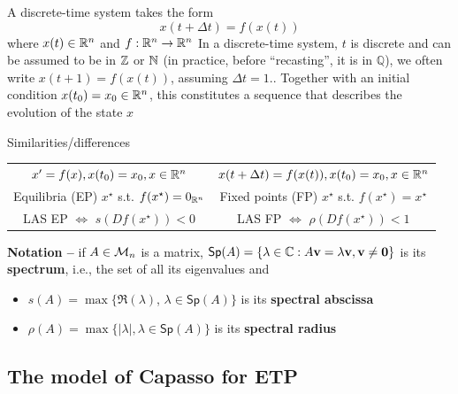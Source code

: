 \documentclass[aspectratio=169]{beamer}
\begin{document}
\begin{frame}
  A discrete-time system takes the form
  \begin{equation}\label{eq:DTS}
    x(t+\Delta t) = f(x(t))
  \end{equation}
  where $x(t)\in\mathbb{R}^n$ and $f:\mathbb{R}^n\to\mathbb{R}^n$
  \vfill
  In a discrete-time system, $t$ is discrete and can be assumed to be in $\mathbb{Z}$ or $\mathbb{N}$ (in practice, before ``recasting'', it is in $\mathbb{Q}$), we often write $x(t+1)=f(x(t))$, assuming $\Delta t=1$..
  \vfill
  Together with an initial condition $x(t_0)=x_0\in\mathbb{R}^n$, this constitutes a sequence that describes the evolution of the state $x$
\end{frame}

\begin{frame}{Similarities/differences}
  \begin{center}
    \renewcommand{\arraystretch}{1.5}
    \begin{tabular}{cc}
      $x'=f(x), x(t_0)=x_0, x\in\mathbb{R}^n$
      &
      $x(t+\Delta t)=f(x(t)), x(t_0)=x_0, x\in\mathbb{R}^n$ \\
      Equilibria (EP) $x^\star$ s.t. $f(x^\star)=0_{\mathbb{R}^n}$ 
      &
      Fixed points (FP) $x^\star$ s.t. $f(x^\star)=x^\star$ \\
      LAS EP $\Leftrightarrow$ $s(Df(x^\star))<0$
      &
      LAS FP $\Leftrightarrow$ $\rho(Df(x^\star))<1$ \\
      
    \end{tabular}    
  \end{center}
  \vfill
  \textbf{Notation --} 
  if $A\in\mathcal{M}_n$ is a matrix, $\mathsf{Sp}(A)=\{\lambda\in\IC: A\bv=\lambda\bv,\bv\neq\b0\}$ is its \textbf{spectrum}, i.e., the set of all its eigenvalues and
  \begin{itemize}
    \item $s(A)=\max\{\Re(\lambda)$, $\lambda\in\mathsf{Sp}(A)\}$ is its \textbf{spectral abscissa}
    \item $\rho(A)=\max\{|\lambda|,\lambda\in\mathsf{Sp}(A)\}$ is its \textbf{spectral radius}
  \end{itemize}
\end{frame}

\subsection{The model of Capasso for ETP}
\end{document}
